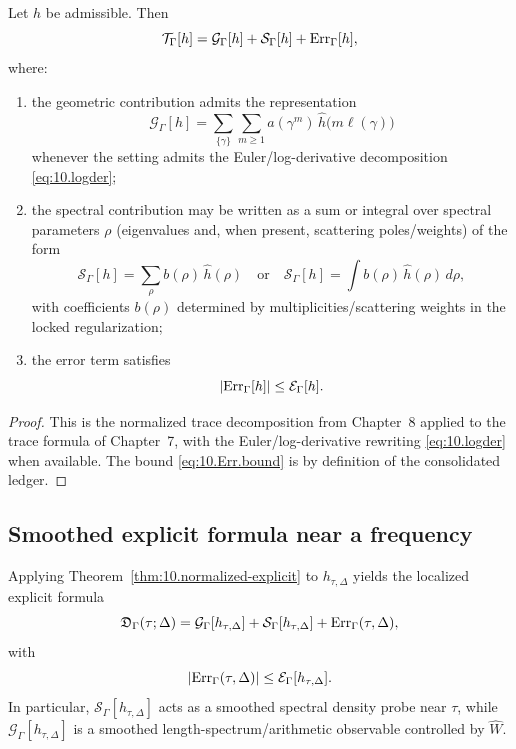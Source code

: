 \begin{theorem}\label{thm:10.normalized-explicit}
Let $h$ be admissible. Then
\begin{equation}\label{eq:10.explicit}
\mathcal T_\Gamma[h]=\mathcal G_\Gamma[h]+\mathcal S_\Gamma[h]+\mathrm{Err}_\Gamma[h],
\end{equation}
where:
\begin{enumerate}
\item the geometric contribution admits the representation
\begin{equation}\label{eq:10.G.form}
\mathcal G_\Gamma[h]=\sum_{\{\gamma\}}\sum_{m\ge1} a(\gamma^m)\,\widehat h\!\bigl(m\ell(\gamma)\bigr)
\end{equation}
whenever the setting admits the Euler/log-derivative decomposition \eqref{eq:10.logder};
\item the spectral contribution may be written as a sum or integral over spectral parameters $\rho$ (eigenvalues and, when present,
scattering poles/weights) of the form
\begin{equation}\label{eq:10.S.form}
\mathcal S_\Gamma[h]=\sum_{\rho} b(\rho)\,\widehat h(\rho)
\quad\text{or}\quad
\mathcal S_\Gamma[h]=\int b(\rho)\,\widehat h(\rho)\,d\rho,
\end{equation}
with coefficients $b(\rho)$ determined by multiplicities/scattering weights in the locked regularization;
\item the error term satisfies
\begin{equation}\label{eq:10.Err.bound}
|\mathrm{Err}_\Gamma[h]|\le \mathcal E_\Gamma[h].
\end{equation}
\end{enumerate}
\end{theorem}

\begin{proof}
This is the normalized trace decomposition from Chapter~8 applied to the trace formula of Chapter~7, with the
Euler/log-derivative rewriting \eqref{eq:10.logder} when available. The bound \eqref{eq:10.Err.bound} is by definition of
the consolidated ledger.
\end{proof}

\subsection{Smoothed explicit formula near a frequency}
\label{subsec:10.explicit.smoothed}

Applying Theorem~\ref{thm:10.normalized-explicit} to $h_{\tau,\Delta}$ yields the localized explicit formula
\begin{equation}\label{eq:10.explicit.smoothed.eq}
\mathfrak D_\Gamma(\tau;\Delta)=\mathcal G_\Gamma[h_{\tau,\Delta}]+\mathcal S_\Gamma[h_{\tau,\Delta}]+\mathrm{Err}_\Gamma(\tau,\Delta),
\end{equation}
with
\[
|\mathrm{Err}_\Gamma(\tau,\Delta)|\le \mathcal E_\Gamma[h_{\tau,\Delta}].
\]
In particular, $\mathcal S_\Gamma[h_{\tau,\Delta}]$ acts as a smoothed spectral density probe near $\tau$, while
$\mathcal G_\Gamma[h_{\tau,\Delta}]$ is a smoothed length-spectrum/arithmetic observable controlled by $\widehat W$.

